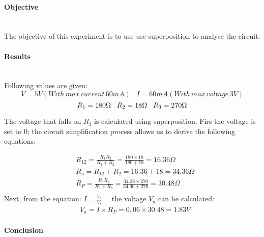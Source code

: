 \paragraph*{Objective} \hfill \\
The objective of this experiment is to use use superposition to analyse the circuit. 

\paragraph*{Results} \hfill \\
Following values are given:
\begin{equation}
V=5V (With\,max\,current\,60mA) \,\,\,\,\,  I=60mA (With\,max\,voltage\,3V)  
\end{equation}
\begin{equation}
R_{1}=180\Omega \,\,\,\,\, R_{2}=18\Omega \,\,\,\,\, R_{3}=270\Omega \\
\end{equation}

The voltage that falls on $R_{3}$ is calculated using superposition.
Firs the voltage is set to 0; the circuit simplification process allows us to derive the following equations:

\begin{align*}
&R_{12}= \frac{R_{1}R_{2}}{R_{1}+R_{2}}=\frac{180\times 18}{180+18} = 16.36\Omega \\
&R_{5}= R_{12}+R_{2} = 16.36+18=34.36\Omega \\
&R_{P}= \frac{R_{5}R_{3}}{R_{5}+R_{3}}=\frac{34.36\times 270}{34.36+270}=30.48\Omega \\
\end{align*}
Next, from the equation: $ I=\frac{V_{a}}{V_{b}} $ \,\,\,\, the voltage $V_{a}$ can be calculated:\\
\begin{align*}
&V_{a}=I\times R_{P} = 0,06 \times 30.48 = 1.83 V 
\end{align*}



\paragraph*{Conclusion} \hfill \\

